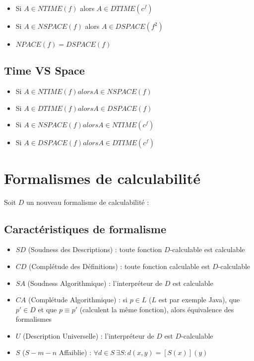\begin{itemize}
\item Si $A \in NTIME(f)$ alors $A \in DTIME(c^f)$
\item Si $A \in NSPACE(f)$ alors $A \in DSPACE(f^2)$
\item $NPACE(f) = DSPACE(f)$
\end{itemize}

\subsection{Time VS Space}

\begin{itemize}
\item Si $A \in NTIME(f) alors A \in NSPACE(f)$
\item Si $A \in DTIME(f) alors A \in DSPACE(f)$
\item Si $A \in NSPACE(f) alors A \in NTIME(c^f)$
\item Si $A \in DSPACE(f) alors A \in DTIME(c^f)$
\end{itemize}

\section{Formalismes de calculabilité}

Soit $D$ un nouveau formalisme de calculabilité :

\subsection{Caractéristiques de formalisme}

\begin{itemize}
\item $SD$ (Soudness des Descriptions) : toute fonction $D$-calculable est calculable
\item $CD$ (Complétude des Définitions) : toute fonction calculable est $D$-calculable
\item $SA$ (Soudness Algorithmique) : l'interpréteur de $D$ est calculable
\item $CA$ (Complétude Algorithmique) : si $p \in L$ ($L$ est par exemple Java), que $p' \in D$ et que $p \equiv p'$ (calculent la même fonction), alors équivalence des formalismes
\item $U$ (Description Universelle) : l'interpréteur de $D$ est $D$-calculable
\item $S$ ($S-m-n$ Affaiblie) : $\forall d \in S \ \exists S : d(x,y) = [S(x)](y)$
\end{itemize}

